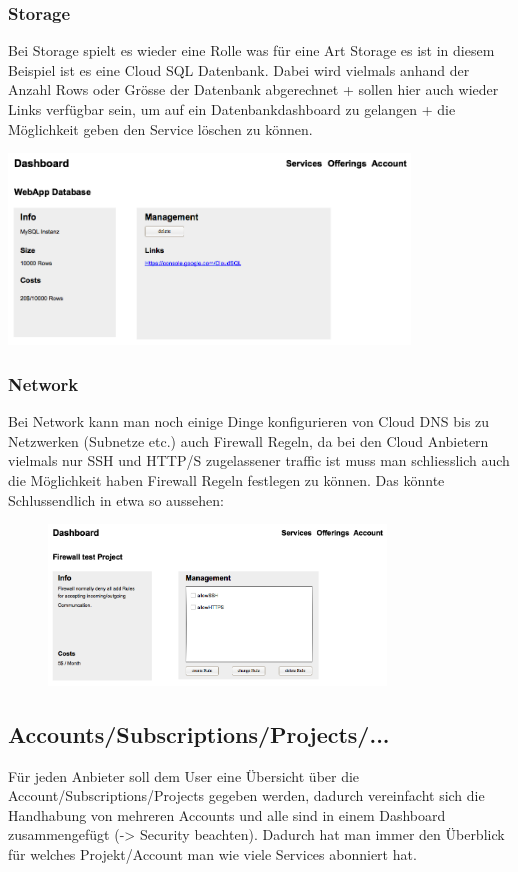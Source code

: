 \documentclass[11pt]{scrartcl}
\begin{document}
\subsubsection{Storage}
Bei Storage spielt es wieder eine Rolle was für eine Art Storage es ist in 
diesem Beispiel ist es eine Cloud SQL Datenbank.
Dabei wird vielmals anhand der Anzahl Rows oder Grösse der Datenbank abgerechnet 
+ sollen hier auch wieder Links verfügbar sein, um auf ein Datenbankdashboard zu 
gelangen + die Möglichkeit geben den Service löschen zu können.

\includegraphics[width=0.8\textwidth]{service_info_storage}


\subsubsection{Network}
Bei Network kann man noch einige Dinge konfigurieren von Cloud DNS bis zu 
Netzwerken (Subnetze etc.) auch Firewall Regeln, da bei den Cloud Anbietern 
vielmals nur SSH und HTTP/S zugelassener traffic ist muss man schliesslich auch 
die Möglichkeit haben Firewall Regeln festlegen zu können.
Das könnte Schlussendlich in etwa so aussehen:

\begin{figure}[h]
  \includegraphics[width=0.8\textwidth]{service_info_network}
\end{figure}



\subsection{Accounts/Subscriptions/Projects/...}
Für jeden Anbieter soll dem User eine Übersicht über die 
Account/Subscriptions/Projects gegeben werden, dadurch vereinfacht sich die 
Handhabung von mehreren Accounts und alle sind in einem Dashboard zusammengefügt 
(-> Security beachten).
Dadurch hat man immer den Überblick für welches Projekt/Account man wie viele 
Services abonniert hat.
\end{document}
